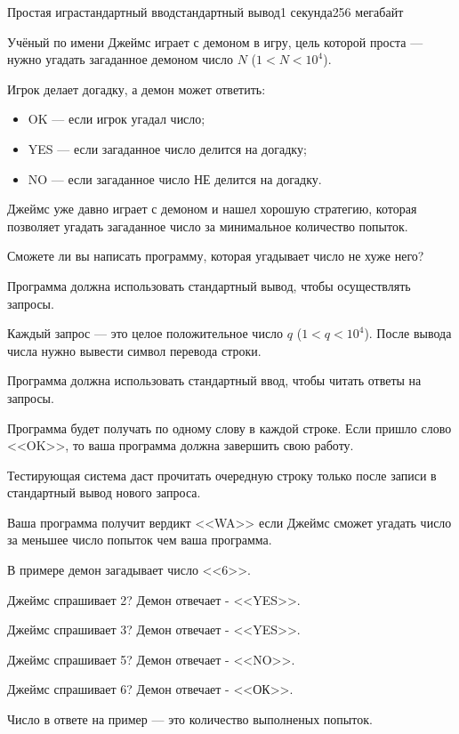 \begin{problem}{Простая игра}{стандартный ввод}{стандартный вывод}{1 секунда}{256 мегабайт}

Учёный по имени Джеймс играет с демоном в игру, цель которой проста --- нужно угадать загаданное демоном число $N$ ($1 < N < 10^4$).

Игрок делает догадку, а демон может ответить:

\begin{itemize}\setlength\itemsep{0pt}
\item OK --- если игрок угадал число;
\item YES --- если загаданное число делится на догадку;
\item NO --- если загаданное число НЕ делится на догадку.
\end{itemize}

Джеймс уже давно играет с демоном и нашел хорошую стратегию, которая позволяет угадать загаданное число за минимальное количество попыток.

Сможете ли вы написать программу, которая угадывает число не хуже него?

\Interaction
Программа должна использовать стандартный вывод, чтобы осуществлять запросы.

Каждый запрос --- это целое положительное число $q$ ($1 < q < 10^4$). После вывода числа нужно вывести символ перевода строки.

Программа должна использовать стандартный ввод, чтобы читать ответы на запросы.

Программа будет получать по одному слову в каждой строке. Если пришло слово <<OK>>, то ваша программа должна завершить свою работу.

Тестирующая система даст прочитать очередную строку только после записи в стандартный вывод нового запроса.

\Example

\begin{example}
%
\end{example}

\Note
Ваша программа получит вердикт <<WA>> если Джеймс сможет угадать число за меньшее число попыток чем ваша программа.

В примере демон загадывает число <<6>>.

Джеймс спрашивает 2? Демон отвечает - <<YES>>.

Джеймс спрашивает 3? Демон отвечает - <<YES>>.

Джеймс спрашивает 5? Демон отвечает - <<NO>>.

Джеймс спрашивает 6? Демон отвечает - <<ОК>>.

Число в ответе на пример --- это количество выполненых попыток.

\end{problem}

